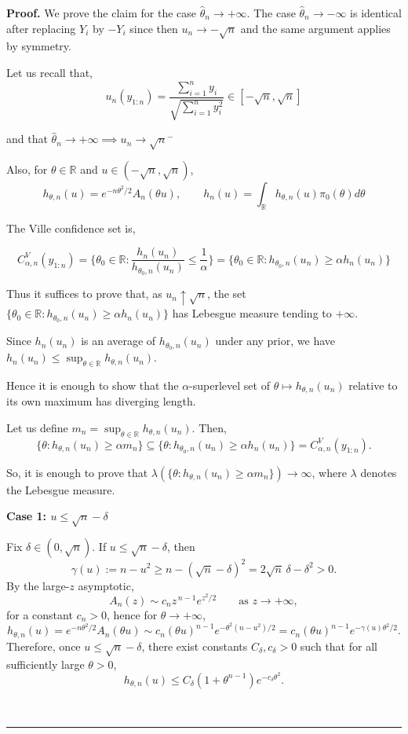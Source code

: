 \documentclass{article}%
\newenvironment{proof}[1][Proof]{\noindent\textbf{#1.} }{\ \rule{0.5em}{0.5em}}
\begin{document}
\begin{proof}
    We prove the claim for the case $\hat{\theta}_n \longrightarrow +\infty$. The case $\hat{\theta}_n \longrightarrow -\infty$ is identical after replacing $Y_i$ by $-Y_i$ since then $u_n \longrightarrow - \sqrt{n}$ and the same argument applies by symmetry.

Let us recall that,
\[
u_n(y_{1:n})=\frac{\sum_{i=1}^n y_i}{\sqrt{\sum_{i=1}^n y_i^2}}\in[-\sqrt{n},\sqrt{n}]
\]

and that $\hat{\theta}_n \longrightarrow +\infty \implies u_n \longrightarrow \sqrt{n}^{-}$

Also, for $\theta \in \mathbb{R}$ and $u \in (-\sqrt{n}, \sqrt{n})$,
\[
h_{\theta,n}(u)=e^{-n\theta^2/2}A_n(\theta u), \qquad h_n(u) = \int_{\mathbb{R}} h_{\theta,n}(u) \pi_0(\theta)d\theta
\]

The Ville confidence set is,

\[
C_{\alpha, n}^V (y_{1:n}) = \{ \theta_0 \in \mathbb{R}: \frac{h_n(u_n)}{h_{\theta_0, n}(u_n)} \leq \frac{1}{\alpha} \} = \{ \theta_0 \in \mathbb{R}: h_{\theta_0, n}(u_n) \geq \alpha h_n(u_n) \}
\]

Thus it suffices to prove that, as $u_n \uparrow \sqrt{n}$, the set $\{\theta_0 \in \mathbb{R}: h_{\theta_0, n}(u_n) \geq \alpha h_n(u_n) \}$ has Lebesgue measure tending to $+\infty$.

Since $h_n(u_n)$ is an average of $h_{\theta_0, n}(u_n)$ under any prior, we have $h_{ n}(u_n) \leq \sup_{\theta \in \mathbb{R}} h_{\theta, n}(u_n)$.

Hence it is enough to show that the $\alpha$-superlevel set of $\theta \mapsto h_{\theta, n} (u_n)$ relative to its own maximum has diverging length.

Let us define $m_n = \sup_{\theta \in \mathbb{R}} h_{\theta, n}(u_n)$. Then, 
$$\{\theta: h_{\theta, n}(u_n) \geq \alpha m_n \} \subseteq \{\theta: h_{\theta_0, n}(u_n) \geq \alpha h_n(u_n) \} = C_{\alpha, n}^V(y_{1:n}).$$ 

So, it is enough to prove that $\lambda(\{\theta: h_{\theta, n}(u_n) \geq \alpha m_n \}) \longrightarrow \infty$, where $\lambda$ denotes the Lebesgue measure.

\textbf{Case 1: $u \leq \sqrt{n} - \delta$}

Fix \(\delta\in(0,\sqrt n)\). If \(u\le \sqrt n-\delta\), then
\[
\gamma(u):=n-u^2 \ge n-(\sqrt n-\delta)^2 = 2\sqrt n\,\delta-\delta^2 >0.
\]
By the large-\(z\) asymptotic,
\[
A_n(z)\sim c_n z^{\,n-1}e^{z^2/2}\qquad \text{as }z\to+\infty,
\]
for a constant \(c_n>0\), hence for \(\theta\to+\infty\),
\[
h_{\theta,n}(u)
=
e^{-n\theta^2/2}A_n(\theta u)
\sim
c_n (\theta u)^{n-1} e^{-\theta^2(n-u^2)/2}
=
c_n (\theta u)^{n-1} e^{-\gamma(u)\theta^2/2}.
\]
Therefore, once \(u\le \sqrt n-\delta\), there exist constants \(C_\delta,c_\delta>0\) such that for all sufficiently large \(\theta>0\),
\[
h_{\theta,n}(u)\le C_\delta (1+\theta^{n-1})e^{-c_\delta\theta^2}.
\]


\end{proof}
\end{document}

